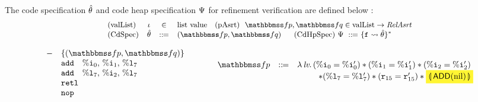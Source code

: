 The code specification $\hat{\theta}$ and code heap specification 
$\Psi$ for refinement verification are defined below : 
\[
    \small
    \begin{array}{lccl}
        \TYPE{(valList)} & 
        \lgvl & \in & \TYPE{list} \ \TYPE{value}
        \quad
        \TYPE{(pAsrt)} \ \
        \relspecpre, \relspecpost \in
        \TYPE{valList} \rightarrow \textit{RelAsrt} \\
        \TYPE{(CdSpec)} & \RelBspec & \define & 
        (\relspecpre, \relspecpost) \quad \ \   
        \TYPE{(CdHpSpec)} \ \Cspec \ \define \ 
        \{ \lab{} \rightsquigarrow \RelBspec \}^{*} 
    \end{array}
\]
\begin{figure*}[!t]
    \[
		\begin{array}{cc}
			\begin{array}{ll}
				- & \{(\relspecpre, \relspecpost)\} \\
				& \cadd \quad \ireg{0}, \, \ireg{1}, \, \lreg{7} \\
				& \cadd \quad \lreg{7}, \, \ireg{2}, \, \lreg{7} \\
				& \retl \\
				& \nop
			\end{array} & \quad\quad
			
			\begin{array}{lcl}
				\relspecpre & \define &
                \lambda \, \lv.\, %
                (\ireg{0} = \ireg{0}')
                \sepstar (\ireg{1} = \ireg{1}')
                \sepstar (\ireg{2} = \ireg{2}') 
                \\
				& &
                \hspace*{6ex} 
                \sepstar (\lreg{7} = \lreg{7}')
                \sepstar (\reg{15} = \reg{15}') 
                \sepstar
                \colorbox{yellow!80}
                	{$\safePrimAst{\,\primAdd(\nil)\,}$}
                \\
				\\[-8pt]
				

\end{array}
\end{array}\]
\end{figure*}
